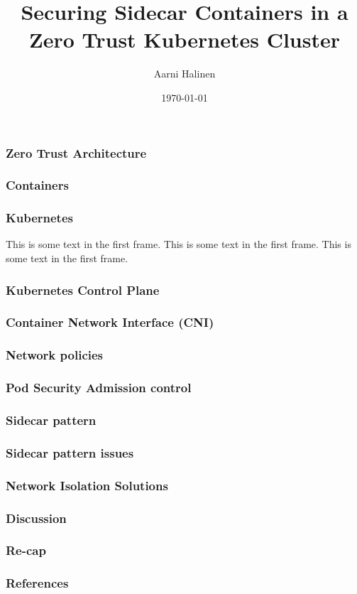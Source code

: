\documentclass{beamer}
\title{Securing Sidecar Containers in a Zero Trust Kubernetes Cluster}
\author{Aarni Halinen}
\institute{
  Department of Computer Science\\
  Aalto University
}
\date{\today}
\begin{document}

\begin{frame}
\frametitle{Zero Trust Architecture}
\end{frame}

\begin{frame}
\frametitle{Containers}
\end{frame}

\begin{frame}
\frametitle{Kubernetes}
This is some text in the first frame. This is some text in the first frame. This is some text in the first frame.
\end{frame}

\begin{frame}
\frametitle{Kubernetes Control Plane}
\end{frame}

\begin{frame}
\frametitle{Container Network Interface (CNI)}
\end{frame}

\begin{frame}
\frametitle{Network policies}
\end{frame}

\begin{frame}
\frametitle{Pod Security Admission control}
\end{frame}

\begin{frame}
\frametitle{Sidecar pattern}
\end{frame}

\begin{frame}
\frametitle{Sidecar pattern issues}
\end{frame}

\begin{frame}
\frametitle{Network Isolation Solutions}
\end{frame}

\begin{frame}
\frametitle{Discussion}
\end{frame}

\begin{frame}
\frametitle{Re-cap}
\end{frame}

\begin{frame}
\frametitle{References}
\end{frame}
\end{document}

